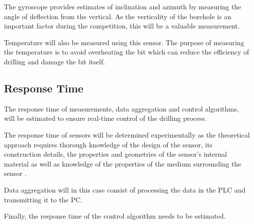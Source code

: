 The gyroscope provides estimates of inclination and azimuth by measuring the angle of deflection from the vertical. As the verticality of the borehole is an important factor during the competition, this will be a valuable measurement.

Temperature will also be measured using this sensor. The purpose of measuring the temperature is to avoid overheating the bit which can reduce the efficiency of drilling and damage the bit itself.

\subsection{Response Time}
The response time of measurements, data aggregation and control algorithms, will be estimated to ensure real-time control of the drilling process.

The response time of sensors will be determined experimentally as the theoretical approach requires thorough knowledge of the design of the sensor, its construction details, the properties and geometries of the sensor’s internal material as well as knowledge of the properties of the medium surrounding the sensor \cite{hash}.

Data aggregation will in this case consist of processing the data in the PLC and transmitting it to the PC.

Finally, the response time of the control algorithm needs to be estimated.
